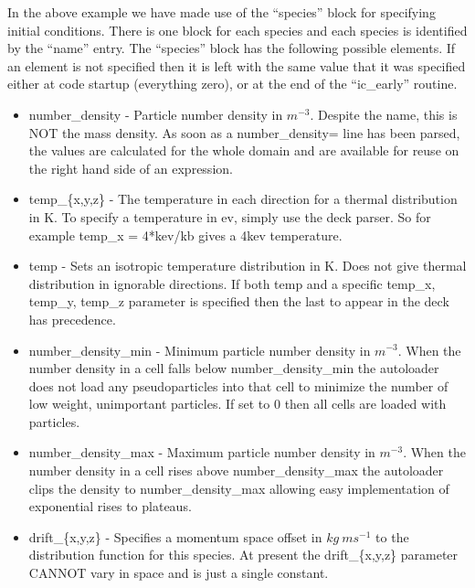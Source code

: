 \documentclass[12pt,a4paper]{article}
\begin{document}
In the above example we have made use of the ``species'' block for specifying
initial conditions. There is one block for each species
and each species is identified by the ``name'' entry.
The ``species'' block has the following possible elements. If an element
is not specified then it is left with the same value that it was specified
either at code startup (everything zero), or at the end of the ``ic\_early''
routine.\\
\begin{itemize}
\item number\_density - Particle number density in $m^{-3}$. Despite the name, this is
  NOT the mass density. As soon as a number\_density= line has been parsed, the values are
  calculated for the whole domain and are available for reuse on the right hand
  side of an expression.
\item temp\_\{x,y,z\} - The temperature in each direction for a thermal
  distribution in K. To specify a temperature in ev, simply use the deck
  parser. So for example temp\_x = 4*kev/kb gives a 4kev temperature.
\item temp - Sets an isotropic temperature distribution in K. Does not give
  thermal distribution in ignorable directions. If both temp and a specific
  temp\_x, temp\_y, temp\_z parameter is specified then the last to appear in
  the deck has precedence.
\item number\_density\_min - Minimum particle number density in $m^{-3}$. When the number
  density in a cell falls below number\_density\_min the autoloader does not load any
  pseudoparticles into that cell to minimize the number of low weight,
  unimportant particles. If set to 0 then all cells are loaded with particles.
\item number\_density\_max - Maximum particle number density in $m^{-3}$. When the number
  density in a cell rises above number\_density\_max the autoloader clips the density to
  number\_density\_max allowing easy implementation of exponential rises to plateaus.
\item drift\_\{x,y,z\} - Specifies a momentum space offset in $kg\ ms^{-1}$ to
  the distribution function for this species. At present the drift\_\{x,y,z\}
  parameter CANNOT vary in space and is just a single constant.
\end{itemize}
\end{document}
